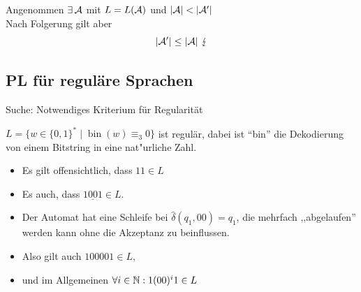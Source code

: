 Angenommen $\exists\,\mathcal{A}$ mit $L=L(\mathcal{A})$ und $|\A|<|\A'|$\\
Nach Folgerung gilt aber
\[ |\A'| \leq |\A|\ \lightning \]

\subsection{\acf{PL} für reguläre Sprachen} %
Suche: Notwendiges Kriterium für Regularität
\begin{Bsp*}
		$L = \{ w\in \{0,1\}^* \mid \operatorname{bin}(w)\equiv_3 0\}$ ist regulär, dabei ist "`bin"' die Dekodierung von einem Bitstring in eine nat"urliche Zahl.
    \begin{center}
  \end{center}
  \begin{itemize}
  \item Es gilt offensichtlich, dass $11 \in L$
  \item Es auch, dass $1 \underline{0 0} 1 \in L$.
  \item Der Automat hat eine Schleife bei $\hat\delta({q_1,00}) = q_1$, die mehrfach ,,abgelaufen'' werden kann ohne die Akzeptanz zu beinflussen.
  \item Also gilt auch $100001 \in L$,
  \item und im Allgemeinen $\forall i\in\mathbb{N}: 1(00)^i1 \in L$
  \end{itemize}
\end{Bsp*}

